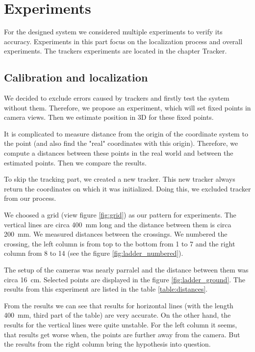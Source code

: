 \chapter{Experiments} 

For the designed system we considered multiple experiments to
verify its accuracy. Experiments in this part focus on the localization process
and overall experiments. The trackers experiments are located in the chapter
Tracker.

\section{Calibration and localization}

We decided to exclude errors caused by trackers and firstly test the system
without them. Therefore, we propose an experiment, which will set fixed points
in camera views. Then we estimate position in 3D for these fixed points.

It is complicated to measure distance from the origin of the coordinate system
to the point (and also find the "real" coordinates with this origin).
Therefore, we compute a distances between these points in the real world and
between the estimated points. Then we compare the results.
 
To skip the tracking part, we created a new tracker. This new tracker always
return the coordinates on which it was initialized. Doing this, we excluded
tracker from our process.

We choosed a grid (view figure \ref{fig:grid}) as our pattern for experiments.
The vertical lines are circa 400~mm long and the distance between them is circa
200~mm. We measured distances between the crossings. We numbered the crossing,
the left column is from top to the bottom from 1 to 7 and the right column from
8 to 14 (see the figure \ref{fig:ladder_numbered}).

The setup of the cameras was nearly parralel and the distance between them was
circa 16~cm. Selected points are displayed in the figure \ref{fig:ladder_ground}. The
results from this experiment are listed in the table \ref{table:distances}. 

From the results we can see that results for horizontal lines (with the length
400~mm, third part of the table) are very accurate. On the other hand, the
results for the vertical lines were quite unstable. For the left column it
seems, that results get worse when, the points are further away from the
camera. But the results from the right column bring the hypothesis into
question. 

